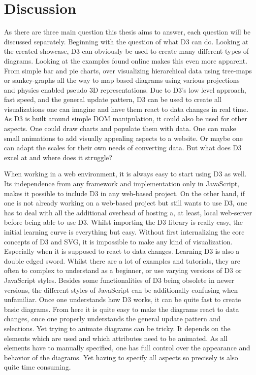 \chapter{Discussion}

As there are three main question this thesis aims to answer, each question will be discussed separately. Beginning with the question of what D3 can do. Looking at the created showcase, D3 can obviously be used to create many different types of diagrams. Looking at the examples found online makes this even more apparent. From simple bar and pie charts, over visualizing hierarchical data using tree-maps or sankey-graphs all the way to map based diagrams using various projections and physics enabled pseudo 3D representations. Due to D3's low level approach, fast speed, and the general update pattern, D3 can be used to create all visualizations one can imagine and have them react to data changes in real time. As D3 is built around simple DOM manipulation, it could also be used for other aspects. One could draw charts and populate them with data. One can make small animations to add visually appealing aspects to a website. Or maybe one can adapt the scales for their own needs of converting data. But what does D3 excel at and where does it struggle?

When working in a web environment, it is always easy to start using D3 as well. Its independence from any framework and implementation only in JavaScript, makes it possible to include D3 in any web-based project. On the other hand, if one is not already working on a web-based project but still wants to use D3, one has to deal with all the additional overhead of hosting a, at least, local web-server before being able to use D3. Whilst importing the D3 library is really easy, the initial learning curve is everything but easy. Without first internalizing the core concepts of D3 and SVG, it is impossible to make any kind of visualization. Especially when it is supposed to react to data changes. Learning D3 is also a double edged sword. Whilst there are a lot of examples and tutorials, they are often to complex to understand as a beginner, or use varying versions of D3 or JavaScript styles. Besides some functionalities of D3 being obsolete in newer versions, the different styles of JavaScript can be additionally confusing when unfamiliar. Once one understands how D3 works, it can be quite fast to create basic diagrams. From here it is quite easy to make the diagrams react to data changes, once one properly understands the general update pattern and selections. Yet trying to animate diagrams can be tricky. It depends on the elements which are used and which attributes need to be animated. As all elements have to manually specified, one has full control over the appearance and behavior of the diagrams. Yet having to specify all aspects so precisely is also quite time consuming.

